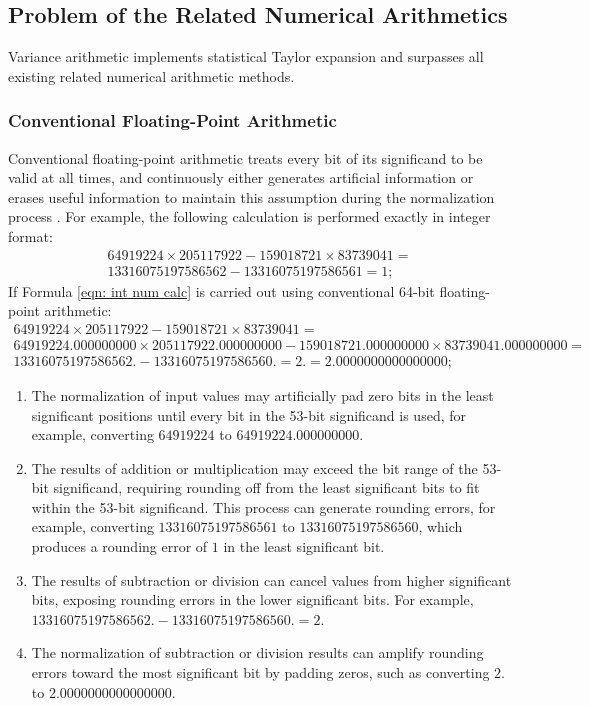 \documentclass[twoside]{article}
\numberwithin{equation}{section}
\begin{document}
\subsection{Problem of the Related Numerical Arithmetics}

Variance arithmetic implements statistical Taylor expansion and surpasses all existing related numerical arithmetic methods.


\subsubsection{Conventional Floating-Point Arithmetic}

Conventional floating-point arithmetic \cite{Computer_Architecture}\cite{Floating_Point_Arithmetic}\cite{Floating_Point_Standard} treats every bit of its significand to be valid at all times, and continuously either generates artificial information or erases useful information to maintain this assumption during the normalization process \cite{Arithmetic_Digital_Computers}.
For example, the following calculation is performed exactly in integer format:
\begin{multline}
\label{eqn: int num calc}
64919224 \times 205117922 - 159018721 \times 83739041=\\
13316075197586562 - 13316075197586561 = 1;
\end{multline}
If Formula \eqref{eqn: int num calc} is carried out using conventional 64-bit floating-point arithmetic: 
\begin{multline}
\label{eqn: float num calc}
64919224 \times 205117922 - 159018721 \times 83739041 =\\ 
64919224.000000000 \times 205117922.000000000 - 159018721.000000000 \times 83739041.000000000 =\\
13316075197586562. - 13316075197586560. = 2. = 2.0000000000000000;
\end{multline}
\begin{enumerate}
\item  The normalization of input values may artificially pad zero bits in the least significant positions until every bit in the 53-bit significand is used, for example, converting $64919224$ to $64919224.000000000$.

\item  The results of addition or multiplication may exceed the bit range of the 53-bit significand, requiring rounding off from the least significant bits to fit within the 53-bit significand. 
This process can generate rounding errors, for example, converting $13316075197586561$ to $13316075197586560$, which produces a rounding error of $1$ in the least significant bit.

\item The results of subtraction or division can cancel values from higher significant bits, exposing rounding errors in the lower significant bits. For example, $13316075197586562. - 13316075197586560. = 2$.

\item  The normalization of subtraction or division results can amplify rounding errors toward the most significant bit by padding zeros, such as converting $2.$ to $2.0000000000000000$.  

\end{enumerate}
\end{document}
